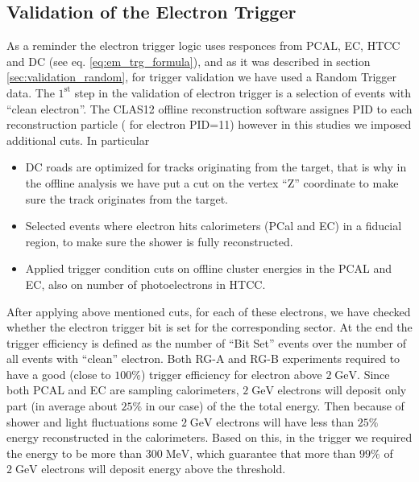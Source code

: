 \subsection{Validation of the Electron Trigger}
\label{elctron_trigger_validation}
As a reminder the electron trigger logic uses responces from PCAL, EC, HTCC and DC (see eq. \ref{eq:em_trg_formula}), and as it was described in section \ref{sec:validation_random}, for trigger validation we have used a Random Trigger data. 
The $\mathrm{1^{st}}$ step in the validation of electron trigger is a selection of  events with ``clean electron''. The CLAS12 offline reconstruction software assignes PID to each reconstruction particle \cite{offline-ref} ( for electron PID=11) however in this studies we imposed additional cuts. 
In particular 
\begin{itemize}
 \item DC roads are optimized for tracks originating from the target, that is why in the offline analysis we have put a cut on the vertex ``Z'' coordinate to make sure the track originates from the target.
 \item Selected events where electron hits calorimeters (PCal and EC) in a fiducial region, to make sure the shower is fully reconstructed.
 \item Applied trigger condition cuts on offline cluster energies in the PCAL and EC, also on number of photoelectrons in HTCC.
\end{itemize}
After applying above mentioned cuts, for each of these electrons, we have checked whether the electron trigger bit is set for the corresponding sector. At the end the trigger efficiency is defined as the number of ``Bit  Set'' events over the number of all events with ``clean'' electron.
Both RG-A and RG-B experiments required to have a good (close to $100 \%$) trigger efficiency for electron above $\mathrm{2\;GeV}$. Since both PCAL and EC are sampling calorimeters, $\mathrm{2\;GeV}$ electrons will deposit only part (in average about $25\%$ in our case) of the the total energy. Then because of shower and light fluctuations some $\mathrm{2\;GeV}$ electrons will have less than $\mathrm{25\%}$ energy reconstructed in the calorimeters. Based on this, in the trigger we required the energy to be more than $\mathrm{300 \; MeV}$, which guarantee that more than $\mathrm{99\%}$ of $\mathrm{2\;GeV}$ electrons will deposit energy above the threshold.

